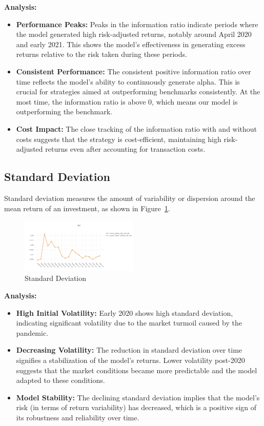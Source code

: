 \documentclass[conference]{IEEEtran}
\begin{document}
\textbf{Analysis:}
\begin{itemize}
    \item \textbf{Performance Peaks:} Peaks in the information ratio indicate periods where the model generated high risk-adjusted returns, notably around April 2020 and early 2021. This shows the model's effectiveness in generating excess returns relative to the risk taken during these periods.
    \item \textbf{Consistent Performance:} The consistent positive information ratio over time reflects the model's ability to continuously generate alpha. This is crucial for strategies aimed at outperforming benchmarks consistently. At the most time, the information ratio is above 0, which means our model is outperforming the benchmark.
    \item \textbf{Cost Impact:} The close tracking of the information ratio with and without costs suggests that the strategy is cost-efficient, maintaining high risk-adjusted returns even after accounting for transaction costs.
\end{itemize}

\begin{center}
    \subsection*{\textbf{Standard Deviation}}
\end{center}

Standard deviation measures the amount of variability or dispersion around the mean return of an investment, as shown in Figure~\ref{fig:standard deviation}.

\begin{figure}[h!]
\centering
    \includegraphics[width=0.5\textwidth]{std.png}
    \caption{Standard Deviation}
    \label{fig:standard deviation}
\end{figure}

\textbf{Analysis:}
\begin{itemize}
    \item \textbf{High Initial Volatility:} Early 2020 shows high standard deviation, indicating significant volatility due to the market turmoil caused by the pandemic.
    \item \textbf{Decreasing Volatility:} The reduction in standard deviation over time signifies a stabilization of the model's returns. Lower volatility post-2020 suggests that the market conditions became more predictable and the model adapted to these conditions.
    \item \textbf{Model Stability:} The declining standard deviation implies that the model's risk (in terms of return variability) has decreased, which is a positive sign of its robustness and reliability over time.
\end{itemize}
\end{document}
